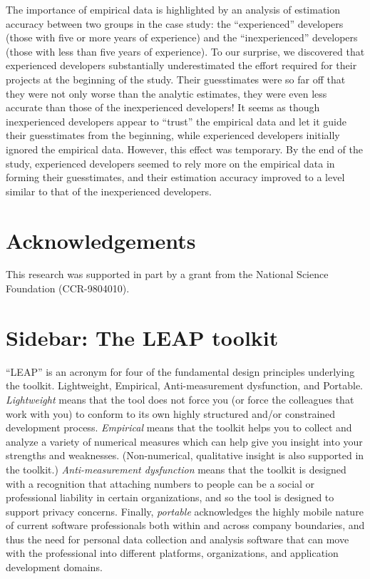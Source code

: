 \begin{enumerate}
  The importance of empirical data is highlighted by an analysis of
  estimation accuracy between two groups in the case study: the
  ``experienced'' developers (those with five or more years of experience)
  and the ``inexperienced'' developers (those with less than five years of
  experience).  To our surprise, we discovered that
  experienced developers substantially underestimated the effort required
  for their projects at the beginning of the study. Their guesstimates were 
  so far off that they were not only worse than the analytic estimates,
  they were even less accurate than those of the inexperienced developers!
  It seems
  as though inexperienced developers appear to ``trust'' the
  empirical data and let it guide their guesstimates from the beginning, while
  experienced developers initially ignored the empirical data.  However,
  this effect was temporary.  By the end of the study, experienced
  developers seemed to rely more on the empirical data in forming their
  guesstimates, and their estimation accuracy improved to a level similar to that of
  the inexperienced developers. 


\end{enumerate}

\section{Acknowledgements}

This research was supported in part by a grant from the National Science
Foundation (CCR-9804010). 

\section{Sidebar: The LEAP toolkit}

``LEAP'' is an acronym for four of the fundamental design principles
underlying the toolkit.  Lightweight, Empirical, Anti-measurement
dysfunction, and Portable.  {\em Lightweight} means that the tool does not force
you (or force the colleagues that work with you) to conform to its own highly
structured and/or constrained development process.  {\em Empirical} means that
the toolkit helps you to collect and analyze a variety of numerical
measures which can help give you insight into your strengths and
weaknesses. (Non-numerical, qualitative insight is also supported in the
toolkit.)  {\em Anti-measurement dysfunction} \cite{Austin96} means that the toolkit is
designed with a recognition that attaching numbers to people can be a
social or professional liability in certain organizations, and so the tool
is designed to support privacy concerns.  Finally, {\em portable} acknowledges
the highly mobile nature of current software professionals both within and
across company boundaries, and thus the need for personal data collection
and analysis software that can move with the professional into different
platforms, organizations, and application development domains. 

